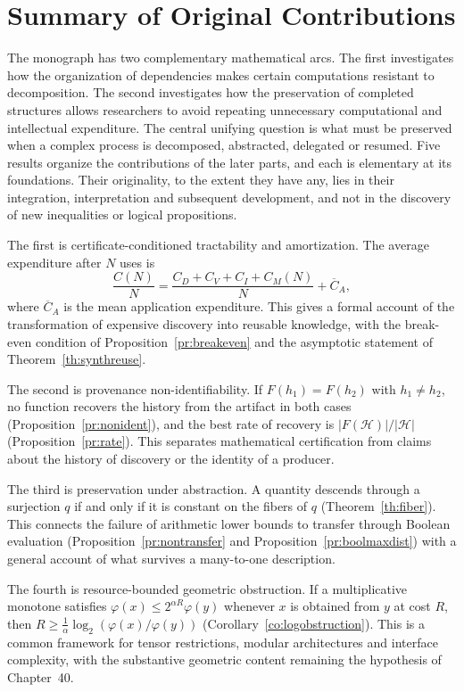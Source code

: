\documentclass[11pt,letterpaper]{report}
\theoremstyle{plain}
\theoremstyle{definition}
\theoremstyle{remark}
\begin{document}
\chapter*{Summary of Original Contributions}

The monograph has two complementary mathematical arcs. The first investigates how the organization of dependencies makes certain computations resistant to decomposition. The second investigates how the preservation of completed structures allows researchers to avoid repeating unnecessary computational and intellectual expenditure. The central unifying question is what must be preserved when a complex process is decomposed, abstracted, delegated or resumed. Five results organize the contributions of the later parts, and each is elementary at its foundations. Their originality, to the extent they have any, lies in their integration, interpretation and subsequent development, and not in the discovery of new inequalities or logical propositions.

The first is certificate-conditioned tractability and amortization. The average expenditure after $N$ uses is
\[
\frac{C(N)}N=\frac{C_D+C_V+C_I+C_M(N)}N+\overline{C}_A,
\]
where $\overline C_A$ is the mean application expenditure. This gives a formal account of the transformation of expensive discovery into reusable knowledge, with the break-even condition of Proposition~\ref{pr:breakeven} and the asymptotic statement of Theorem~\ref{th:synthreuse}.

The second is provenance non-identifiability. If $F(h_1)=F(h_2)$ with $h_1\ne h_2$, no function recovers the history from the artifact in both cases (Proposition~\ref{pr:nonident}), and the best rate of recovery is $|F(\mathcal H)|/|\mathcal H|$ (Proposition~\ref{pr:rate}). This separates mathematical certification from claims about the history of discovery or the identity of a producer.

The third is preservation under abstraction. A quantity descends through a surjection $q$ if and only if it is constant on the fibers of $q$ (Theorem~\ref{th:fiber}). This connects the failure of arithmetic lower bounds to transfer through Boolean evaluation (Proposition~\ref{pr:nontransfer} and Proposition~\ref{pr:boolmaxdist}) with a general account of what survives a many-to-one description.

The fourth is resource-bounded geometric obstruction. If a multiplicative monotone satisfies $\varphi(x)\le2^{\alpha R}\varphi(y)$ whenever $x$ is obtained from $y$ at cost $R$, then $R\ge\tfrac1\alpha\log_2(\varphi(x)/\varphi(y))$ (Corollary~\ref{co:logobstruction}). This is a common framework for tensor restrictions, modular architectures and interface complexity, with the substantive geometric content remaining the hypothesis of Chapter~40.
\end{document}
